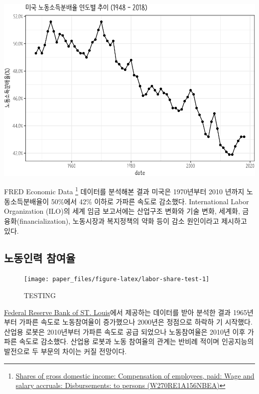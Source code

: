 \documentclass[smallextended]{svjour3}       %
\begin{document}
\begin{center}\includegraphics[width=1\linewidth]{paper_files/figure-latex/labor-share-us-1} \end{center}

FRED Economic Data \footnote{\href{https://fred.stlouisfed.org/series/W270RE1A156NBEA}{Shares
  of gross domestic income: Compensation of employees, paid: Wage and
  salary accruals: Disbursements: to persons (W270RE1A156NBEA)}}
데이터를 분석해본 결과 미국은 1970년부터 2010 년까지 노동소득분배율이
50\%에서 42\% 이하로 가파른 속도로 감소했다. International Labor
Organization (ILO)의 세계 임금 보고서\cite{ilo2015labour}에는 산업구조
변화와 기술 변화, 세계화, 금융화(financialization), 노동시장과
복지정책의 약화 등이 감소 원인이라고 제시하고 있다.

\hypertarget{labor-participation}{%
\subsection{노동인력 참여율}\label{labor-participation}}

\begin{figure}

{\centering \texttt{[image: paper\_files/figure-latex/labor-share-test-1]} 

}

\caption{TESTING}\label{fig:labor-share-test}
\end{figure}

\href{https://research.stlouisfed.org/docs/api/api_key.html}{Federal
Reserve Bank of ST. Louis}에서 제공하는 데이터를 받아 분석한 결과
1965년부터 가파른 속도로 노동참여율이 증가했으나 2000년은 정점으로
하락하 기 시작했다. 산업용 로봇은 2010년부터 가파른 속도로 공급 되었으나
노동참여율은 2010년 이후 가파른 속도로 감소했다. 산업용 로봇과 노동
참여율의 관계는 반비례 적이며 인공지능의 발전으로 두 부문의 차이는 커질
전망이다.
\end{document}
